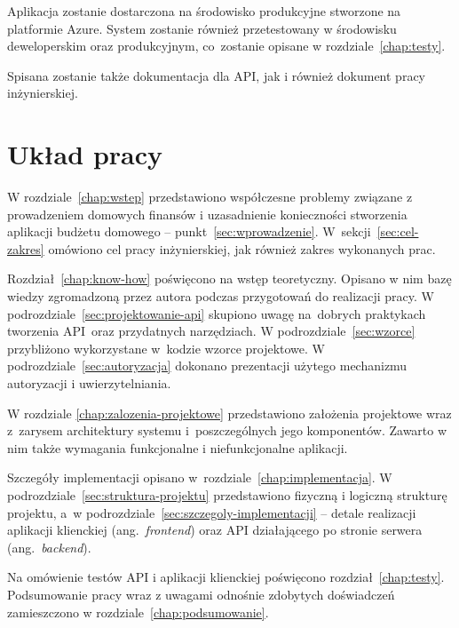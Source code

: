 Aplikacja zostanie dostarczona na środowisko produkcyjne stworzone na platformie Azure. System zostanie również przetestowany w środowisku deweloperskim oraz produkcyjnym, co~zostanie opisane w rozdziale~\ref{chap:testy}.

Spisana zostanie także dokumentacja dla API, jak i również dokument pracy inżynierskiej.

\section{Układ pracy}
\label{sec:uklad-pracy}
W rozdziale~\ref{chap:wstep} przedstawiono współczesne problemy związane z prowadzeniem domowych finansów i uzasadnienie konieczności stworzenia aplikacji budżetu domowego -- punkt~\ref{sec:wprowadzenie}. W~sekcji~\ref{sec:cel-zakres} omówiono cel pracy inżynierskiej, jak również zakres wykonanych prac.

Rozdział~\ref{chap:know-how} poświęcono na wstęp teoretyczny. Opisano w nim bazę wiedzy zgromadzoną przez autora podczas przygotowań do realizacji pracy. W podrozdziale~\ref{sec:projektowanie-api} skupiono uwagę na~dobrych praktykach tworzenia API~oraz przydatnych narzędziach. W podrozdziale~\ref{sec:wzorce} przybliżono wykorzystane w~kodzie wzorce projektowe. W podrozdziale~\ref{sec:autoryzacja} dokonano prezentacji użytego mechanizmu autoryzacji i uwierzytelniania.

W rozdziale \ref{chap:zalozenia-projektowe} przedstawiono założenia projektowe wraz z~zarysem architektury systemu i~poszczególnych jego komponentów. Zawarto w nim także wymagania funkcjonalne i niefunkcjonalne aplikacji.

Szczegóły implementacji opisano w~rozdziale~\ref{chap:implementacja}. W podrozdziale~\ref{sec:struktura-projektu} przedstawiono fizyczną i logiczną strukturę projektu, a~w podrozdziale~\ref{sec:szczegoly-implementacji} -- detale realizacji aplikacji klienckiej (ang.~\emph{frontend}) oraz API działającego po stronie serwera (ang.~\emph{backend}).

Na omówienie testów API i aplikacji klienckiej poświęcono rozdział~\ref{chap:testy}. Podsumowanie pracy wraz z uwagami odnośnie zdobytych doświadczeń zamieszczono w rozdziale~\ref{chap:podsumowanie}.